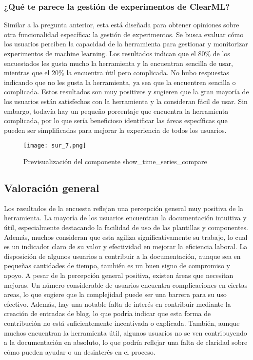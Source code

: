 \subsubsection{¿Qué te parece la gestión de experimentos de ClearML?}
Similar a la pregunta anterior, esta está diseñada para obtener opiniones 
sobre otra funcionalidad específica: la gestión de experimentos. Se busca 
evaluar cómo los usuarios perciben la capacidad de la herramienta para 
gestionar y monitorizar experimentos de machine learning.
Los resultados indican que el 80\% de los encuestados les gusta mucho la 
herramienta y la encuentran sencilla de usar, mientras que el 20\% la encuentra 
útil pero complicada. No hubo respuestas indicando que no les gusta la herramienta, 
ya sea que la encuentren sencilla o complicada. Estos resultados son muy positivos y 
sugieren que la gran mayoría de los usuarios están satisfechos con la herramienta y 
la consideran fácil de usar. Sin embargo, todavía hay un pequeño porcentaje que 
encuentra la herramienta complicada, por lo que sería beneficioso identificar 
las áreas específicas que pueden ser simplificadas para mejorar la experiencia de 
todos los usuarios.

\begin{figure}[!h]
    \centering
    \texttt{[image: sur\_7.png]}
    \caption{Previsualización del componente show\_time\_series\_compare}
    \label{fig:sur_7}
\end{figure}


\subsection{Valoración general}
Los resultados de la encuesta reflejan una percepción general muy positiva de la 
herramienta. La mayoría de los usuarios encuentran la documentación intuitiva y 
útil, especialmente destacando la facilidad de uso de las plantillas y componentes. 
Además, muchos consideran que esta agiliza significativamente su trabajo, lo cual 
es un indicador claro de su valor y efectividad en mejorar la eficiencia laboral. 
La disposición de algunos usuarios a contribuir a la documentación, aunque sea en 
pequeñas cantidades de tiempo, también es un buen signo de compromiso y apoyo.
A pesar de la percepción general positiva, existen áreas que necesitan mejoras. 
Un número considerable de usuarios encuentra complicaciones en ciertas areas, 
lo que sugiere que la complejidad puede ser una barrera para su uso efectivo. 
Además, hay una notable falta de interés en contribuir mediante la creación de 
entradas de blog, lo que podría indicar que esta forma de contribución no está 
suficientemente incentivada o explicada. También, aunque muchos encuentran la 
herramienta útil, algunos usuarios no se ven contribuyendo a la documentación en 
absoluto, lo que podría reflejar una falta de claridad sobre cómo pueden ayudar 
o un desinterés en el proceso.\medskip


